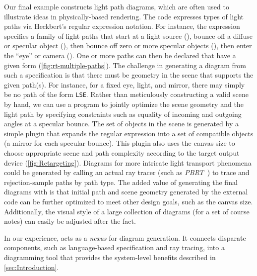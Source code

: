 Our final example constructs light path diagrams, which are often used to illustrate ideas in physically-based rendering.  The \Substance{} code expresses types of light paths via Heckbert's regular expression notation.  For instance, the expression  specifies a family of light paths that start at a light source (), bounce off a diffuse or specular object (), then bounce off zero or more specular objects (), then enter the ``eye'' or camera ().  One or more paths can then be declared that have a given form (\cref{fig:rt-multiple-paths}).  The challenge in generating a diagram from such a specification is that there must be geometry in the scene that supports the given path(s).  For instance, for a fixed eye, light, and mirror, there may simply be no path of the form \texttt{LSE}.  Rather than meticulously constructing a valid scene by hand, we can use a \Style{} program to jointly optimize the scene geometry and the light path by specifying constraints such as equality of incoming and outgoing angles at a specular bounce.  The set of objects in the scene is generated by a simple plugin that expands the regular expression into a set of compatible objects (\eg a mirror for each specular bounce).  This plugin also uses the canvas size to choose appropriate scene and path complexity according to the target output device (\cref{fig:Retargeting}).  Diagrams for more intricate light transport phenomena could be generated by calling an actual ray tracer (such as \emph{PBRT}~\cite{Pharr:2016:PBR}) to trace and rejection-sample paths by path type.  The added value of generating the final diagrams with \Penrose{} is that initial path and scene geometry generated by the external code can be further optimized to meet other design goals, such as the canvas size. Additionally, the visual style of a large collection of diagrams (\eg for a set of course notes) can easily be adjusted after the fact.

In our experience, \Penrose{} acts as a \emph{nexus} for diagram generation. It connects disparate components, such as language-based specification and ray tracing, into a diagramming tool that provides the system-level benefits described in \cref{sec:Introduction}.





